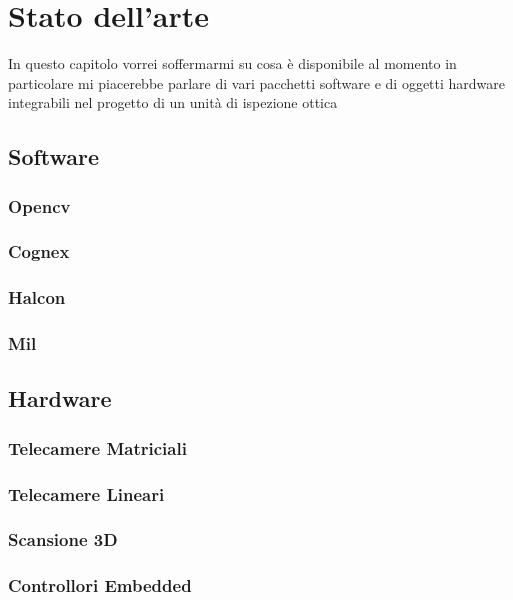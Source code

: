 \chapter{Stato dell'arte}
In questo capitolo vorrei soffermarmi su cosa è disponibile al momento
in particolare mi piacerebbe parlare di vari pacchetti software e di oggetti
hardware integrabili nel progetto di un unità di ispezione ottica

\section{Software}
\subsection{Opencv}
\subsection{Cognex}
\subsection{Halcon}
\subsection{Mil}

\section{Hardware}
\subsection{Telecamere Matriciali}
\subsection{Telecamere Lineari}
\subsection{Scansione 3D}
\subsection{Controllori Embedded}

\endinput